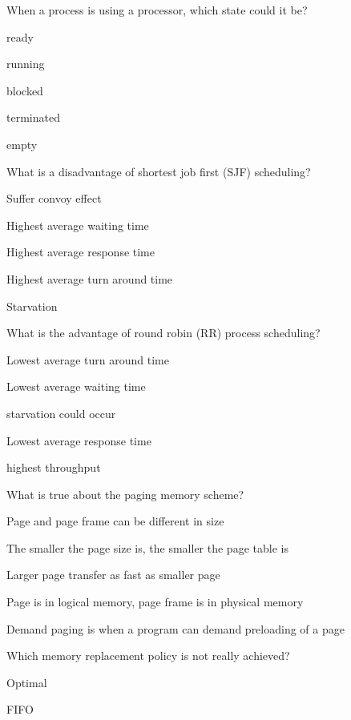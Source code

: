 \begin{questions}\setlength{\itemsep}{0.08cm}\setcounter{question}{35}
\question When a process is using a processor, which state could it be?
\begin{verticalchoices}
\item ready
\item running
\item blocked
\item terminated
\item empty
\end{verticalchoices}
\question What is a disadvantage of shortest job first (SJF) scheduling?
\begin{verticalchoices}
\item Suffer convoy effect
\item Highest average waiting time
\item Highest average response time
\item Highest average turn around time
\item Starvation
\end{verticalchoices}
\question What is the advantage of round robin (RR) process scheduling?
\begin{verticalchoices}
\item Lowest average turn around time
\item Lowest average waiting time
\item starvation could occur
\item Lowest average response time
\item highest throughput
\end{verticalchoices}
\question What is true about the paging memory scheme?
\begin{verticalchoices}
\item Page and page frame can be different in size
\item The smaller the page size is, the smaller the page table is
\item Larger page transfer as fast as smaller page
\item Page is in logical memory, page frame is in physical memory
\item Demand paging is when a program can demand preloading of a page
\end{verticalchoices}
\question Which memory replacement policy is not really achieved?
\begin{verticalchoices}
\item Optimal
\item FIFO

\end{verticalchoices}
\end{questions}

